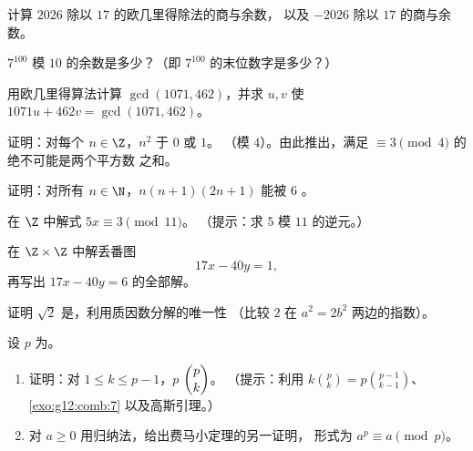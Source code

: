 \begin{exercise}[$\star$]\label{exo:g12:arith:1}
计算 $2026$ 除以 $17$ 的欧几里得除法的商与余数，
以及 $-2026$ 除以 $17$ 的商与余数。
\end{exercise}

\begin{exercise}[$\star$]\label{exo:g12:arith:2}
$7^{100}$ 模 $10$ 的余数是多少？（即
$7^{100}$ 的末位数字是多少？）
\end{exercise}

\begin{exercise}[$\star$]\label{exo:g12:arith:3}
用欧几里得算法计算 $\gcd(1071, 462)$，并求
$u, v$ 使 $1071u + 462v = \gcd(1071, 462)$。
\end{exercise}

\begin{exercise}[$\star$]\label{exo:g12:arith:4}
证明：对每个 $n \in \Z$，$n^2$ 于 $0$ 或 $1$。
（模 $4$）。由此推出，满足 $\equiv 3 \pmod 4$ 的绝不可能是两个平方数
之和。
\end{exercise}

\begin{exercise}[$\star\star$]\label{exo:g12:arith:5}
证明：对所有 $n \in \N$，$n(n+1)(2n+1)$ 能被 $6$ 。
\end{exercise}

\begin{exercise}[$\star\star$]\label{exo:g12:arith:6}
在 $\Z$ 中解式 $5x \equiv 3 \pmod{11}$。
（提示：求 $5$ 模 $11$ 的逆元。）
\end{exercise}

\begin{exercise}[$\star\star$]\label{exo:g12:arith:7}
在 $\Z \times \Z$ 中解丢番图
\[
17x - 40y = 1,
\]
再写出 $17x - 40y = 6$ 的全部解。
\end{exercise}

\begin{exercise}[$\star\star$]\label{exo:g12:arith:8}
证明 $\sqrt2$ 是，利用质因数分解的唯一性
（比较 $2$ 在 $a^2 = 2b^2$ 两边的指数）。
\end{exercise}

\begin{exercise}[$\star\star\star$]\label{exo:g12:arith:9}
设 $p$ 为。
\begin{enumerate}
  \item 证明：对 $1 \leq k \leq p - 1$，$p$  $\dbinom{p}{k}$。
        （提示：利用 $k\binom pk = p\binom{p-1}{k-1}$、\cref{exo:g12:comb:7}
        以及高斯引理。）
  \item 对 $a \geq 0$ 用归纳法，给出费马小定理的另一证明，
        形式为 $a^p \equiv a \pmod p$。
\end{enumerate}
\end{exercise}

